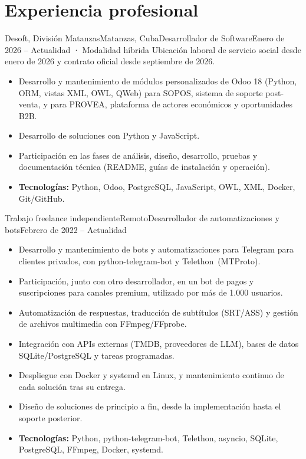 \section{Experiencia profesional}

\begin{cvjob}{Desoft, División Matanzas}{Matanzas, Cuba}{Desarrollador de Software}{Enero de 2026 – Actualidad · Modalidad híbrida}
Ubicación laboral de servicio social desde enero de 2026 y contrato oficial desde septiembre de 2026.

\begin{itemize}
  \item Desarrollo y mantenimiento de módulos personalizados de Odoo 18 (Python, ORM, vistas XML, OWL, QWeb) para SOPOS, sistema de soporte \mbox{post-venta}, y para PROVEA, plataforma de actores económicos y oportunidades B2B.
  \item Desarrollo de soluciones con Python y JavaScript.
  \item Participación en las fases de análisis, diseño, desarrollo, pruebas y documentación técnica (README, guías de instalación y operación).
  \item \textbf{Tecnologías:} Python, Odoo, PostgreSQL, JavaScript, OWL, XML, Docker, \mbox{Git/GitHub}.
\end{itemize}
\end{cvjob}

\begin{cvjob}{Trabajo freelance independiente}{Remoto}{Desarrollador de automatizaciones y bots}{Febrero de 2022 – Actualidad}
\begin{itemize}
  \item Desarrollo y mantenimiento de bots y automatizaciones para Telegram para clientes privados, con \mbox{python-telegram-bot} y \mbox{Telethon (MTProto)}.
  \item Participación, junto con otro desarrollador, en un bot de pagos y suscripciones para canales premium, utilizado por más de 1.000 usuarios.
  \item Automatización de respuestas, traducción de subtítulos (\mbox{SRT/ASS}) y gestión de archivos multimedia con \mbox{FFmpeg/FFprobe}.
  \item Integración con APIs externas (TMDB, proveedores de LLM), bases de datos \mbox{SQLite/PostgreSQL} y tareas programadas.
  \item Despliegue con Docker y \mbox{systemd} en Linux, y mantenimiento continuo de cada solución tras su entrega.
  \item Diseño de soluciones de principio a fin, desde la implementación hasta el soporte posterior.
  \item \textbf{Tecnologías:} Python, \mbox{python-telegram-bot}, Telethon, asyncio, SQLite, PostgreSQL, FFmpeg, Docker, \mbox{systemd}.
\end{itemize}
\end{cvjob}

